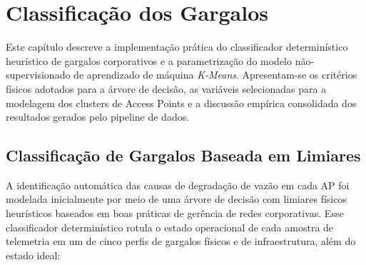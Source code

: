 \chapter{Classificação dos Gargalos}
\label{cap:classificacao}

Este capítulo descreve a implementação prática do classificador determinístico heurístico de gargalos corporativos e a parametrização do modelo não-supervisionado de aprendizado de máquina \textit{K-Means}. Apresentam-se os critérios físicos adotados para a árvore de decisão, as variáveis selecionadas para a modelagem dos clusters de Access Points e a discussão empírica consolidada dos resultados gerados pelo pipeline de dados.

\section{Classificação de Gargalos Baseada em Limiares}
\label{sec:classificacao_limiares_cap}

A identificação automática das causas de degradação de vazão em cada AP foi modelada inicialmente por meio de uma árvore de decisão com limiares físicos heurísticos baseados em boas práticas de gerência de redes corporativas. Esse classificador determinístico rotula o estado operacional de cada amostra de telemetria em um de cinco perfis de gargalos físicos e de infraestrutura, além do estado ideal:

